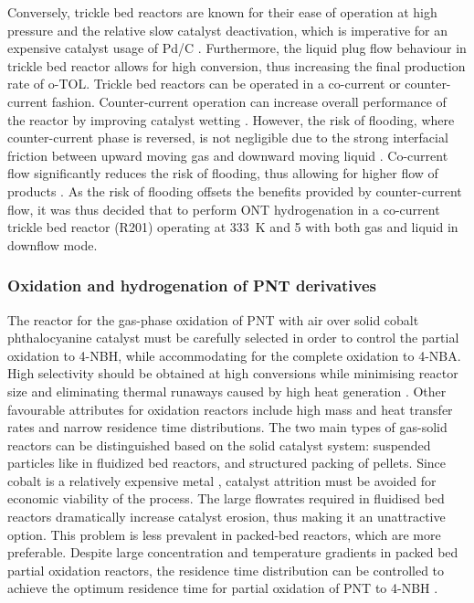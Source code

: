 Conversely, trickle bed reactors are known for their ease of operation at high pressure and the relative slow catalyst deactivation, which is imperative for an expensive catalyst usage of Pd/C \cite{vemala_hydrodynamic_nodate}. Furthermore, the liquid plug flow behaviour in trickle bed reactor allows for high conversion, thus increasing the final production rate of o-TOL. Trickle bed reactors can be operated in a co-current or counter-current fashion. Counter-current operation can increase overall performance of the reactor by improving catalyst wetting \cite{kundu_novel_2003}. However, the risk of flooding, where counter-current phase is reversed, is not negligible due to the strong interfacial friction between upward moving gas and downward moving liquid \cite{breijer_prevention_2008}. Co-current flow significantly reduces the risk of flooding, thus allowing for higher flow of products \cite{vemala_hydrodynamic_nodate}. As the risk of flooding offsets the benefits provided by counter-current flow, it was thus decided that to perform ONT hydrogenation in a co-current trickle bed reactor (R201) operating at \SI{333}{\K} and \SI{5}{\atm} with both gas and liquid in downflow mode. 


\subsubsection{Oxidation and hydrogenation of PNT derivatives}

The reactor for the gas-phase oxidation of PNT with air over solid cobalt phthalocyanine catalyst must be carefully selected in order to control the partial oxidation to 4-NBH, while accommodating for the complete oxidation to 4-NBA. High selectivity should be obtained at high conversions while minimising reactor size and eliminating thermal runaways caused by high heat generation \cite{schmidt_catalytic_1994}. Other favourable attributes for oxidation reactors include high  mass and heat transfer rates and narrow residence time distributions. The two main types of gas-solid reactors can be distinguished based on the solid catalyst system: suspended particles like in fluidized bed reactors, and structured packing of pellets. Since cobalt is a relatively expensive metal \cite{saib_fundamental_2014}, catalyst attrition must be avoided for economic viability of the process. The large flowrates required in fluidised bed reactors dramatically increase catalyst erosion, thus making it an unattractive option. This problem is less prevalent in packed-bed reactors, which are more preferable. Despite large concentration and temperature gradients in packed bed partial oxidation reactors, the residence time distribution can be controlled to achieve the optimum residence time for partial oxidation of PNT to 4-NBH \cite{schmidt_catalytic_1994}.

